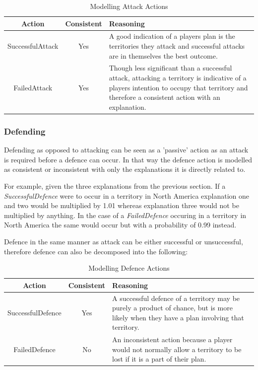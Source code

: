 \documentclass[parskip]{cs4rep}
\begin{document}
\begin{table}[ht]
\centering
\begin{tabular}{|c|c|p{8cm}|}
\hline 
\textbf{Action} & \textbf{Consistent}  & \textbf{Reasoning} \\ 
\hline 
SuccessfulAttack & Yes & A good indication of a players plan is the territories they attack and successful attacks are in themselves the best outcome. \\ 
\hline 
FailedAttack & Yes & Though less significant than a successful attack, attacking a territory is indicative of a players intention to occupy that territory and therefore a consistent action with an explanation.\\ 
\hline
\end{tabular}
\caption{Modelling Attack Actions}
\label{table:attack-modelling}
\end{table}

\newpage

\subsubsection{Defending}

Defending as opposed to attacking can be seen as a 'passive' action as an attack is required before a defence can occur. In that way the defence action is modelled as consistent or inconsistent with only the explanations it is directly related to. 

For example, given the three explanations from the previous section. If a \textit{SuccessfulDefence} were to occur in a territory in North America explanation one and two would be multiplied by 1.01 whereas explanation three would not be multiplied by anything. In the case of a \textit{FailedDefence} occuring in a territory in North America the same would occur but with a probability of 0.99 instead. 

Defence in the same manner as attack can be either successful or unsuccessful, therefore defence can also be decomposed into the following: 

\begin{table}[ht]
\centering
\begin{tabular}{|c|c|p{8cm}|}
\hline 
\textbf{Action} & \textbf{Consistent}  & \textbf{Reasoning} \\ 
\hline 
SuccessfulDefence & Yes & A successful defence of a territory may be purely a product of chance, but is more likely when they have a plan involving that territory. \\ 
\hline 
FailedDefence & No & An inconsistent action because a player would not normally allow a territory to be lost if it is a part of their plan. \\ 
\hline
\end{tabular}
\caption{Modelling Defence Actions}
\label{table:attack-defend-modelling}
\end{table}
\end{document}
